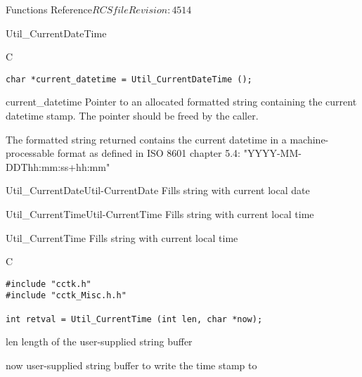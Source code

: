 \begin{cactuspart}{ Functions Reference}{$RCSfile$}{$Revision: 4514 $}
\begin{FunctionDescription}{Util\_CurrentDateTime}
\begin{SynopsisSection}
\begin{Synopsis}{C}
\begin{verbatim}
char *current_datetime = Util_CurrentDateTime ();
\end{verbatim}
\end{Synopsis}
\end{SynopsisSection}

\begin{ResultSection}
\begin{Result}{current\_datetime}
Pointer to an allocated formatted string containing the current datetime stamp.
The pointer should be freed by the caller.
\end{Result}
\end{ResultSection}

\begin{Discussion}
The formatted string returned contains the current datetime in a
machine-processable format as defined in ISO 8601 chapter 5.4:
{\code "YYYY-MM-DDThh:mm:ss+hh:mm"}
\end{Discussion}

\begin{SeeAlsoSection}
\begin{SeeAlso2}{Util\_CurrentDate}{Util-CurrentDate}
  Fills string with current local date
\end{SeeAlso2}
\begin{SeeAlso2}{Util\_CurrentTime}{Util-CurrentTime}
  Fills string with current local time
\end{SeeAlso2}
\end{SeeAlsoSection}

\end{FunctionDescription}

\begin{FunctionDescription}{Util\_CurrentTime}
\label{Util-CurrentTime}
Fills string with current local time

\begin{SynopsisSection}
\begin{Synopsis}{C}
\begin{verbatim}
#include "cctk.h"
#include "cctk_Misc.h.h"

int retval = Util_CurrentTime (int len, char *now);
\end{verbatim}
\end{Synopsis}
\end{SynopsisSection}

\begin{ParameterSection}
\begin{Parameter}{len}
length of the user-supplied string buffer
\end{Parameter}
\begin{Parameter}{now}
user-supplied string buffer to write the time stamp to
\end{Parameter}
\end{ParameterSection}


\end{FunctionDescription}
\end{cactuspart}
